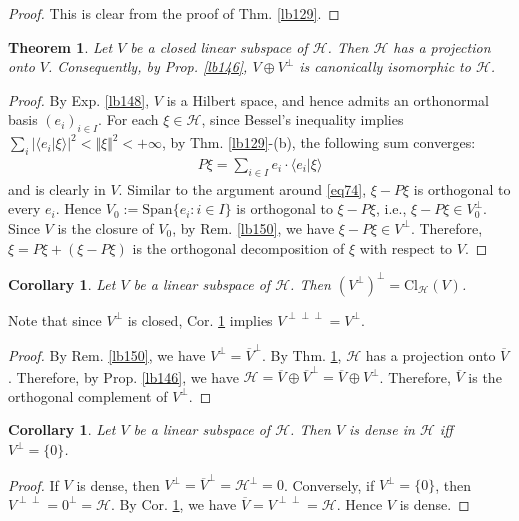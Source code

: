 \documentclass[12pt,b5paper,notitlepage]{article}
\theoremstyle{definition}
\theoremstyle{plain}
\newtheorem{thm}[df]{Theorem}
\newtheorem{co}[df]{Corollary}
\newcommand{\ovl}{\overline}
\newcommand{\Span}{\mathrm{Span}}
\newcommand{\bk}[1]{\langle {#1}\rangle}
\newcommand{\Cl}{\mathrm{Cl}}
\newcommand{\MH}{\mathcal H}
\numberwithin{equation}{section}
\begin{document}
\begin{proof}
This is clear from the proof of Thm. \ref{lb129}.
\end{proof}


\begin{thm}\label{lb149}
Let $V$ be a closed linear subspace of $\MH$. Then $\MH$ has a projection onto $V$. Consequently, by Prop. \ref{lb146}, $V\oplus V^\perp$ is canonically isomorphic to $\MH$.
\end{thm}

\begin{proof}
By Exp. \ref{lb148}, $V$ is a Hilbert space, and hence admits an orthonormal basis $(e_i)_{i\in I}$. For each $\xi\in\MH$, since Bessel's inequality implies $\sum_i|\bk{e_i|\xi}|^2<\Vert\xi\Vert^2<+\infty$, by Thm. \ref{lb129}-(b), the following sum converges:
\begin{align*}
P\xi=\sum_{i\in I}e_i\cdot \bk{e_i|\xi}
\end{align*}
and is clearly in $V$. Similar to the argument around \eqref{eq74}, $\xi-P\xi$ is orthogonal to every $e_i$. Hence $V_0:=\Span\{e_i:i\in I\}$ is orthogonal to $\xi-P\xi$, i.e., $\xi-P\xi\in V_0^\perp$. Since $V$ is the closure of $V_0$, by Rem. \ref{lb150}, we have $\xi-P\xi\in V^\perp$. Therefore, $\xi=P\xi+(\xi-P\xi)$ is the orthogonal decomposition of $\xi$ with respect to $V$.
\end{proof}


\begin{co}\label{lb151}
Let $V$ be a linear subspace of $\MH$. Then $(V^\perp)^\perp=\Cl_\MH(V)$. 
\end{co}

Note that since $V^\perp$ is closed, Cor. \ref{lb151} implies $V^{\perp\perp\perp}=V^\perp$.

\begin{proof}
By Rem. \ref{lb150}, we have $V^\perp=\ovl V^\perp$. By Thm. \ref{lb149}, $\MH$ has a projection onto $\ovl V$. Therefore, by Prop. \ref{lb146}, we have $\MH=\ovl V\oplus \ovl V^\perp=\ovl V\oplus V^\perp$. Therefore, $\ovl V$ is the orthogonal complement of $V^\perp$.
\end{proof}

\begin{co}
Let $V$ be a linear subspace of $\MH$. Then $V$ is dense in $\MH$ iff $V^\perp=\{0\}$. 
\end{co}


\begin{proof}
If $V$ is dense, then $V^\perp=\ovl V^\perp=\MH^\perp=0$. Conversely, if $V^\perp=\{0\}$, then $V^{\perp\perp}=0^\perp=\MH$. By Cor. \ref{lb151}, we have $\ovl V=V^{\perp\perp}=\MH$. Hence $V$ is dense.
\end{proof}
\end{document}
